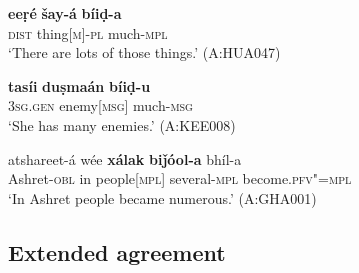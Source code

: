 \begin{exe}
\ex
\label{ex:10-62}
\gll {\ob}\textbf{eeṛé} \textbf{šay-á}{\cb} {\ob}\textbf{bíiḍ-a}{\cb} \\
\textsc{dist} thing[\textsc{m}]-\textsc{pl} much-\textsc{mpl} \\
\glt `There are lots of those things.' (A:HUA047)

\ex
\label{ex:10-63}
\gll {\ob}\textbf{tasíi} \textbf{duṣmaán}{\cb} {\ob}\textbf{bíiḍ-u}{\cb} \\
\textsc{3sg.gen} enemy[\textsc{msg}] much-\textsc{msg} \\
\glt `She has many enemies.' (A:KEE008)

\ex
\label{ex:10-64}
\gll atshareet-á wée {\ob}\textbf{xálak}{\cb} {\ob}\textbf{biǰóol-a}{\cb} bhíl-a \\
Ashret-\textsc{obl} in people[\textsc{mpl}] several-\textsc{mpl} become.\textsc{pfv"=mpl} \\
\glt `In Ashret people became numerous.' (A:GHA001)
\end{exe}

\subsection{Extended agreement}
\label{subsec:10-3-4}


